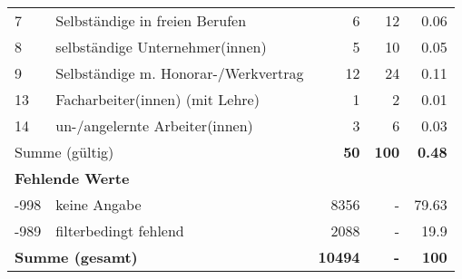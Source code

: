\begin{longtable}{lXrrr}
     7 &
     \multicolumn{1}{X}{ Selbständige in freien Berufen   } &


       \num{6} &
       \num[round-mode=places,round-precision=2]{12} &
         \num[round-mode=places,round-precision=2]{0,06} \\

     8 &
     \multicolumn{1}{X}{ selbständige Unternehmer(innen)   } &


       \num{5} &
       \num[round-mode=places,round-precision=2]{10} &
         \num[round-mode=places,round-precision=2]{0,05} \\

     9 &
     \multicolumn{1}{X}{ Selbständige m. Honorar-/Werkvertrag   } &


       \num{12} &
       \num[round-mode=places,round-precision=2]{24} &
         \num[round-mode=places,round-precision=2]{0,11} \\

     13 &
     \multicolumn{1}{X}{ Facharbeiter(innen) (mit Lehre)   } &


       \num{1} &
       \num[round-mode=places,round-precision=2]{2} &
         \num[round-mode=places,round-precision=2]{0,01} \\

     14 &
     \multicolumn{1}{X}{ un-/angelernte Arbeiter(innen)   } &


       \num{3} &
       \num[round-mode=places,round-precision=2]{6} &
         \num[round-mode=places,round-precision=2]{0,03} \\
     \midrule
     \multicolumn{2}{l}{Summe (gültig)} &
       \textbf{\num{50}} &
     \textbf{100} &
       \textbf{\num[round-mode=places,round-precision=2]{0,48}} \\
     \multicolumn{5}{l}{\textbf{Fehlende Werte}}\\
       -998 &
       keine Angabe &
         \num{8356} &
        - &
         \num[round-mode=places,round-precision=2]{79,63} \\
       -989 &
       filterbedingt fehlend &
         \num{2088} &
        - &
         \num[round-mode=places,round-precision=2]{19,9} \\
     \midrule
     \multicolumn{2}{l}{\textbf{Summe (gesamt)}} &
          \textbf{\num{10494}} &
        \textbf{-} &
        \textbf{100} \\
     \bottomrule
     \end{longtable}
     
